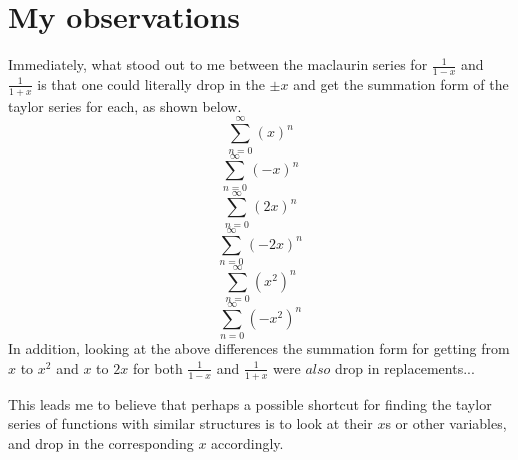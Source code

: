 \documentclass[12pt]{article}
\begin{document}
\section{My observations}
Immediately, what stood out to me between the maclaurin series for $\frac{1}{1-x}$ and $\frac{1}{1+x}$ is that one could literally drop in the $\pm x$ and get the summation form of the taylor series for each, as shown below.
$$\sum_{n=0}^{\infty}\left(x\right)^{n}$$
$$\sum_{n=0}^{\infty}\left(-x\right)^{n}$$
$$\sum_{n=0}^{\infty}\left(2x\right)^{n}$$
$$\sum_{n=0}^{\infty}\left(-2x\right)^{n}$$
$$\sum_{n=0}^{\infty}\left(x^{2}\right)^{n}$$
$$\sum_{n=0}^{\infty}\left(-x^{2}\right)^{n}$$
In addition, looking at the above differences the summation form for getting from $x$ to $x^2$ and $x$ to $2x$ for both $\frac{1}{1-x}$ and $\frac{1}{1+x}$ were $also$ drop in replacements...

This leads me to believe that perhaps a possible shortcut for finding the taylor series of functions with similar structures is to look at their $x$s or other variables, and drop in the corresponding $x$ accordingly.
\end{document}
